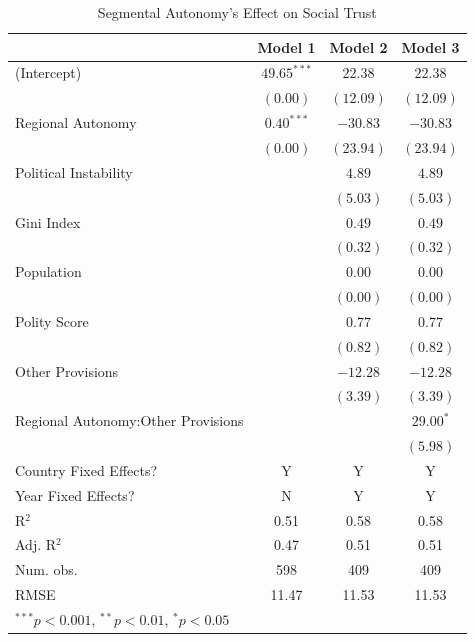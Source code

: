 \documentclass[12pt]{article}
\begin{document}
\begin{table}[!htbp]
	\begin{center}
		\begin{tabular}{l c c c }
			\hline
			& Model 1 & Model 2 & Model 3 \\
			\hline
			(Intercept)                  & $49.65^{***}$ & $22.38$   & $22.38$     \\
			& $(0.00)$      & $(12.09)$ & $(12.09)$   \\
			Regional Autonomy                   & $0.40^{***}$  & $-30.83$  & $-30.83$    \\
			& $(0.00)$      & $(23.94)$ & $(23.94)$   \\
			Political Instability               &               & $4.89$    & $4.89$      \\
			&               & $(5.03)$  & $(5.03)$    \\
			Gini Index               &               & $0.49$    & $0.49$      \\
			&               & $(0.32)$  & $(0.32)$    \\
			Population               &               & $0.00$    & $0.00$      \\
			&               & $(0.00)$  & $(0.00)$    \\
			Polity Score       &               & $0.77$    & $0.77$      \\
			&               & $(0.82)$  & $(0.82)$    \\
			Other Provisions           &               & $-12.28$  & $-12.28$    \\
			&               & $(3.39)$  & $(3.39)$    \\
			Regional Autonomy:Other Provisions &               &           & $29.00^{*}$ \\
			&               &           & $(5.98)$    \\
			\hline
			Country Fixed Effects?		 & Y			 & Y 		   & Y			  \\
			Year Fixed Effects?			 & N			 & Y		   & Y			  \\
			R$^2$                        & 0.51          & 0.58      & 0.58        \\
			Adj. R$^2$                   & 0.47          & 0.51      & 0.51        \\
			Num. obs.                    & 598           & 409       & 409         \\
			RMSE                         & 11.47         & 11.53     & 11.53       \\
			\hline
			\multicolumn{4}{l}{\scriptsize{$^{***}p<0.001$, $^{**}p<0.01$, $^*p<0.05$}}
		\end{tabular}
		\caption{Segmental Autonomy's Effect on Social Trust}
		\label{table:coefficients}
	\end{center}
\end{table}
			
\end{document}
